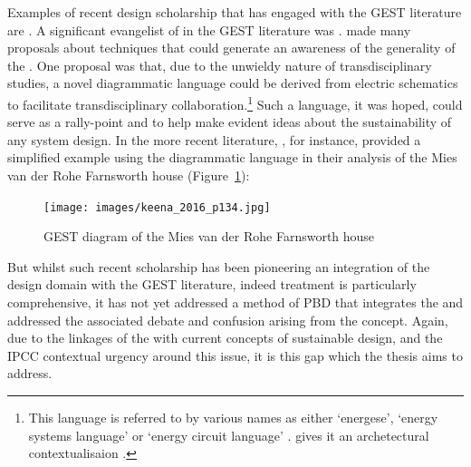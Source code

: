 \documentclass[a4paper, 12pt]{article}
\begin{document}
Examples of recent design scholarship that has engaged with the GEST literature are \citet{braham_architecture_2015, keena_visualization_2016, lee_rightsizing_2019, srinivasan_hierarchy_2015, tabony_ecological_2021}. A significant evangelist of \mpps in the GEST literature was \citeauthor{odum_ecological_1994}. \citeauthor{odum_ecological_1994} made many proposals about techniques that could generate an awareness of the generality of the \mpp \citep{odum_times_1955}. One proposal was that, due to the unwieldy nature of transdisciplinary studies, a novel diagrammatic language could be derived from electric schematics to facilitate transdisciplinary collaboration.\footnote{This language is referred to by various names as either `energese', `energy systems language' or `energy circuit language' \citep{odum_use_1962, odum_tropical_1970, odum_energy_1972, odum_energy_1973, odum_ecological_1994}. \citeauthor{braham_architecture_2015} gives it an archetectural contextualisaion \citep[Appendix A, p.~215]{braham_architecture_2015}.} Such a language, it was hoped, could serve as a rally-point and to help make evident ideas about the sustainability of any system design. In the more recent literature, \citeauthor{keena_visualization_2016}, for instance, provided a simplified example using the diagrammatic language in their analysis of the Mies van der Rohe Farnsworth house (Figure~\ref{fig:keena_2016_p134}):
 
\begin{figure}[H]
    \centering
    \texttt{[image: images/keena\_2016\_p134.jpg]}
    \caption{GEST diagram of the Mies van der Rohe Farnsworth house \citep[p.~134]{keena_visualization_2016}} \label{fig:keena_2016_p134}
\end{figure}

But whilst such recent scholarship has been pioneering an integration of the design domain with the GEST literature, indeed \citeauthor{tabony_ecological_2021} treatment is particularly comprehensive, it has not yet addressed a method of PBD that integrates the \mpps and addressed the associated debate and confusion arising from the \mpps concept. Again, due to the linkages of the \mpps with current concepts of sustainable design, and the IPCC contextual urgency around this issue, it is this gap which the thesis aims to address.








\end{document}
